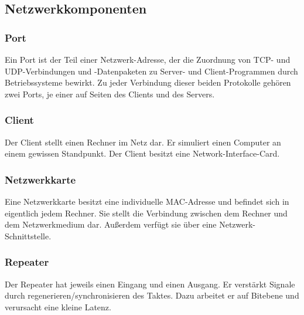 \documentclass[12pt,a4paper]{article}
\begin{document}
		\subsection{Netzwerkkomponenten}
		\subsubsection{Port}
			Ein Port ist der Teil einer Netzwerk-Adresse, der die Zuordnung von TCP- und UDP-Verbindungen und -Datenpaketen zu Server- und Client-Programmen durch Betriebssysteme bewirkt. Zu jeder Verbindung dieser beiden Protokolle gehören zwei Ports, je einer auf Seiten des Clients und des Servers.
		
		\subsubsection{Client}
			Der Client stellt einen Rechner im Netz dar. Er simuliert einen Computer an einem gewissen Standpunkt. Der Client besitzt eine Network-Interface-Card.
			\begin{center}
			\end{center}
		
		\subsubsection{Netzwerkkarte}
			Eine Netzwerkkarte besitzt eine individuelle MAC-Adresse und befindet sich in eigentlich jedem Rechner. Sie stellt die Verbindung zwischen dem Rechner und dem Netzwerkmedium dar. Außerdem verfügt sie über eine Netzwerk-Schnittstelle.
		
		\subsubsection{Repeater}
			Der Repeater hat jeweils einen Eingang und einen Ausgang. Er verstärkt Signale durch regenerieren/synchronisieren des Taktes. Dazu arbeitet er auf Bitebene und verursacht eine kleine Latenz.
				\begin{center}
				\end{center}
		
\end{document}
